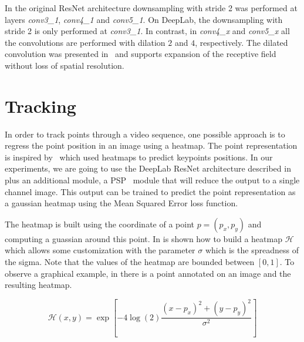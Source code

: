 In the original ResNet architecture downsampling with stride 2 was performed at layers \textit{conv3\_1}, \textit{conv4\_1} and \textit{conv5\_1}.
On DeepLab, the downsampling with stride 2 is only performed at \textit{conv3\_1}.
In contrast, in \textit{conv4\_x} and \textit{conv5\_x} all the convolutions are performed with dilation $2$ and $4$, respectively.
The dilated convolution was presented in~\dilatedconv{} and supports expansion of the receptive field without loss of spatial resolution.


\section{Tracking}
\label{sec:methods:tracking}

In order to track points through a video sequence, one possible approach is to regress the point position in an image using a heatmap.
The point representation is inspired by~\hourglass{} which used heatmaps to predict keypoints positions.
In our experiments, we are going to use the DeepLab ResNet architecture described in  plus an additional module, a PSP~\pspnet{} module that will reduce the output to a single channel image.
This output can be trained to predict the point representation as a gaussian heatmap %
using the Mean Squared Error loss function.

The heatmap is built using the coordinate of a point $p = (p_x, p_y)$ and computing a guassian around this point.
In  is shown how to build a heatmap $\mathcal{H}$ which allows some customization with the parameter $\sigma$ which is the spreadness of the sigma.
Note that the values of the heatmap are bounded between $[0, 1]$.
To observe a graphical example, in  there is a point annotated on an image and the resulting heatmap.

\begin{equation}
  \mathcal{H}(x, y) = \exp \left[ -4 \log(2) \frac{ (x - p_x)^2 + (y - p_y)^2 }{ \sigma^2 } \right]
  \label{eq:tracking:heatmap}
\end{equation}

